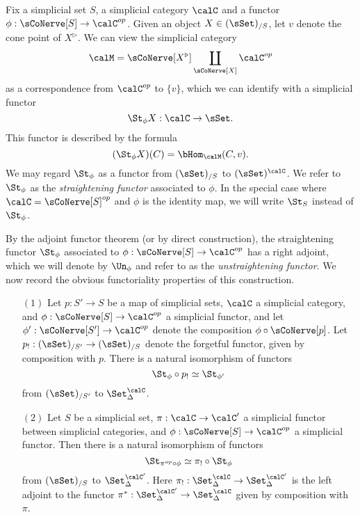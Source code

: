 Fix a simplicial set $S$, a simplicial category $\calC$ and a functor $\phi: \sCoNerve[S] \rightarrow \calC^{op}$. Given an object $X \in (\sSet)_{/S}$, let $v$ denote the cone point of $X^{\triangleright}$. We can view the simplicial category $$\calM = \sCoNerve[X^{\triangleright}] \coprod_{ \sCoNerve[X]} \calC^{op}$$
as a correspondence from $\calC^{op}$ to $\{v\}$, which we can identify with a simplicial functor
$$ \St_{\phi} X: \calC \rightarrow \sSet.$$
This functor is described by the formula
$$ (\St_{\phi} X)(C) = \bHom_{\calM}(C,v).$$
We may regard $\St_{\phi}$ as a functor from $(\sSet)_{/S}$ to $(\sSet)^{\calC}$. We refer to
$\St_{\phi}$ as the {\it straightening functor} associated to $\phi$. In the special case where
$\calC = \sCoNerve[S]^{op}$ and $\phi$ is the identity map, we will write
$\St_{S}$ instead of $\St_{\phi}$.

By the adjoint functor theorem (or by direct construction), the straightening functor $\St_{\phi}$
associated to $\phi: \sCoNerve[S] \rightarrow \calC^{op}$ has a right adjoint, which we will denote by $\Un_{\phi}$ and refer to as the {\it unstraightening functor}. We now record the obvious functoriality properties of this construction.

\begin{proposition}\label{straightchange}
\begin{itemize}
\item[$(1)$] Let $p: S' \rightarrow S$ be a map of simplicial sets, $\calC$ a simplicial category, and
$\phi: \sCoNerve[S] \rightarrow \calC^{op}$ a simplicial functor, and let $\phi': \sCoNerve[S'] \rightarrow \calC^{op}$ denote the composition $\phi \circ \sCoNerve[p]$. 
Let $p_{!}: (\sSet)_{/S'} \rightarrow (\sSet)_{/S}$ denote the forgetful functor, given by composition with $p$. There is a natural isomorphism of functors
$$ \St_{\phi} \circ p_{!} \simeq \St_{\phi'}$$
from $(\sSet)_{/S'}$ to $\Set_{\Delta}^{\calC}$.

\item[$(2)$] Let $S$ be a simplicial set, $\pi: \calC \rightarrow \calC'$ a simplicial functor between simplicial categories, and $\phi: \sCoNerve[S] \rightarrow
\calC^{op}$ a simplicial functor. Then there is a natural isomorphism of functors $$\St_{\pi^{op} \circ \phi} \simeq \pi_{!} \circ \St_{\phi}$$
from $(\sSet)_{/S}$ to $\Set_{\Delta}^{\calC'}$. Here $\pi_{!}: \Set_{\Delta}^{\calC} \rightarrow \Set_{\Delta}^{\calC'}$
is the left adjoint to the functor $\pi^{\ast}: \Set_{\Delta}^{\calC'} \rightarrow \Set_{\Delta}^{\calC}$ given by composition with $\pi$.
\end{itemize}
\end{proposition}

